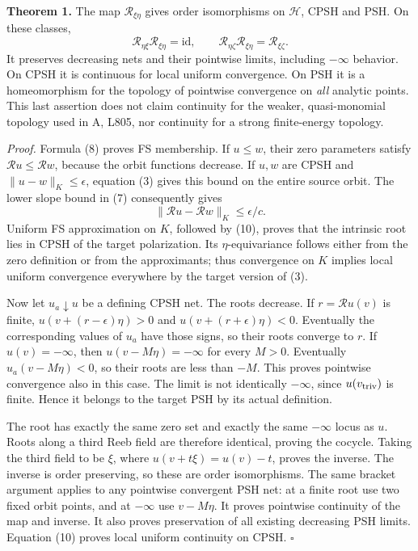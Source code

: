 \documentclass[
  11pt,
]{article}
\begin{document}
\textbf{Theorem 1.} The map \(\mathcal R_{\xi\eta}\) gives order
isomorphisms on \(\mathcal H\), CPSH and PSH. On these classes, \[
 \mathcal R_{\eta\xi}\mathcal R_{\xi\eta}=\mathrm{id},\qquad
 \mathcal R_{\eta\zeta}\mathcal R_{\xi\eta}=\mathcal R_{\xi\zeta}.
 \tag{9}
\] It preserves decreasing nets and their pointwise limits, including
\(-\infty\) behavior. On CPSH it is continuous for local uniform
convergence. On PSH it is a homeomorphism for the topology of pointwise
convergence on \emph{all} analytic points. This last assertion does not
claim continuity for the weaker, quasi-monomial topology used in A,
L805, nor continuity for a strong finite-energy topology.

\emph{Proof.} Formula (8) proves FS membership. If \(u\leq w\), their
zero parameters satisfy \(\mathcal R u\leq\mathcal R w\), because the
orbit functions decrease. If \(u,w\) are CPSH and
\(\|u-w\|_K\leq\epsilon\), equation (3) gives this bound on the entire
source orbit. The lower slope bound in (7) consequently gives \[
 \|\mathcal R u-\mathcal R w\|_K\leq\epsilon/c.       \tag{10}
\] Uniform FS approximation on \(K\), followed by (10), proves that the
intrinsic root lies in CPSH of the target polarization. Its
\(\eta\)-equivariance follows either from the zero definition or from
the approximants; thus convergence on \(K\) implies local uniform
convergence everywhere by the target version of (3).

Now let \(u_a\downarrow u\) be a defining CPSH net. The roots decrease.
If \(r=\mathcal R u(v)\) is finite, \(u(v+(r-\epsilon)\eta)>0\) and
\(u(v+(r+\epsilon)\eta)<0\). Eventually the corresponding values of
\(u_a\) have those signs, so their roots converge to \(r\). If
\(u(v)=-\infty\), then \(u(v-M\eta)=-\infty\) for every \(M>0\).
Eventually \(u_a(v-M\eta)<0\), so their roots are less than \(-M\). This
proves pointwise convergence also in this case. The limit is not
identically \(-\infty\), since \(u(v_{\rm triv})\) is finite. Hence it
belongs to the target PSH by its actual definition.

The root has exactly the same zero set and exactly the same \(-\infty\)
locus as \(u\). Roots along a third Reeb field are therefore identical,
proving the cocycle. Taking the third field to be \(\xi\), where
\(u(v+t\xi)=u(v)-t\), proves the inverse. The inverse is order
preserving, so these are order isomorphisms. The same bracket argument
applies to any pointwise convergent PSH net: at a finite root use two
fixed orbit points, and at \(-\infty\) use \(v-M\eta\). It proves
pointwise continuity of the map and inverse. It also proves preservation
of all existing decreasing PSH limits. Equation (10) proves local
uniform continuity on CPSH. \(\square\)
\end{document}
